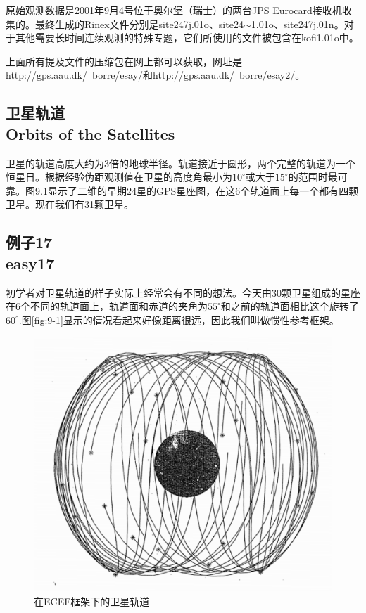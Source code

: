 原始观测数据是2001年9月4号位于奥尔堡（瑞士）的两台JPS Eurocard接收机收集的。最终生成的Rinex文件分别是site247j.01o、site24$\sim$1.01o、site247j.01n。对于其他需要长时间连续观测的特殊专题，它们所使用的文件被包含在kofi1.01o中。

上面所有提及文件的压缩包在网上都可以获取，网址是http://gps.aau.dk/~borre/esay/和http://gps.aau.dk/~borre/esay2/。
	\subsection[卫星轨道]{卫星轨道\\Orbits of the Satellites}
	卫星的轨道高度大约为3倍的地球半径。轨道接近于圆形，两个完整的轨道为一个恒星日。根据经验伪距观测值在卫星的高度角最小为$10^\circ$或大于$15^\circ$的范围时最可靠。图9.1显示了二维的早期24星的GPS星座图，在这6个轨道面上每一个都有四颗卫星。现在我们有31颗卫星。


	\label{subsec:easy17}\subsection[例子17]{例子17\\easy17}
	
	初学者对卫星轨道的样子实际上经常会有不同的想法。今天由30颗卫星组成的星座在6个不同的轨道面上，轨道面和赤道的夹角为$55^\circ$和之前的轨道面相比这个旋转了$60^\circ$.图\ref{fig:9-1}显示的情况看起来好像距离很远，因此我们叫做惯性参考框架。
	\begin{figure}
	\centering
	\includegraphics[width=0.4\linewidth]{TeX_files/Part03/chapter09/image/9-2}
	\caption{在ECEF框架下的卫星轨道}
	\label{fig:9-2}
	\end{figure}

